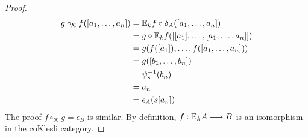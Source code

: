 \begin{prop}
\begin{proof}
\begin{align*}
g \circ_{\mathcal{K}} f([a_{1},\dots,a_{n}]) &= {\mathbb{E}_{k}f} \circ \delta_{A}([a_{1},\dots,a_{n}]) \\ 
&= g \circ {\mathbb{E}_{k}f}([[a_{1}],\dots,[a_{1},\dots,a_{n}]]) \\
&= g(f([a_{1}]),\dots,f([a_{1},\dots,a_{n}])) \\
&= g([b_{1},\dots,b_{n}]) \\
&= \psi_{s}^{-1}(b_{n})  \\
&= a_{n} \\ 
&= \epsilon_{A}(s[a_{n}]) 
\end{align*}
The proof $f \circ_{\mathcal{K}} g = \epsilon_{B}$ is similar. By definition, $f: {\mathbb{E}_{k}A} \longrightarrow B$ is an isomorphism in the coKlesli category.  
\end{proof}
\end{prop}
